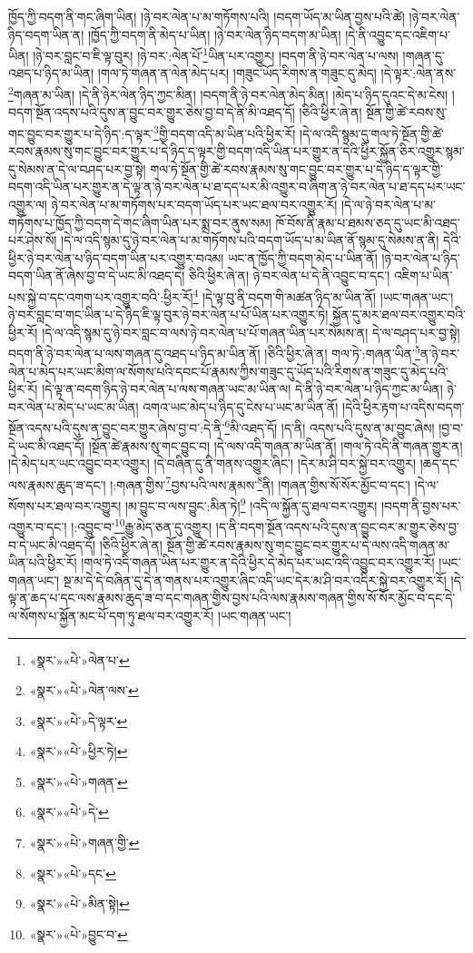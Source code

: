 ཁྱོད་ཀྱི་བདག་ནི་གང་ཞིག་ཡིན། །ཉེ་བར་ལེན་པ་མ་གཏོགས་པའི། །བདག་ཡོད་མ་ཡིན་བྱས་པའི་ཚེ། །ཉེ་བར་ལེན་ཉིད་བདག་ཡིན་ན། །ཁྱོད་ཀྱི་བདག་ནི་མེད་པ་ཡིན། །ཉེ་བར་ལེན་ཉིད་བདག་མ་ཡིན། །དེ་ནི་འབྱུང་དང་འཇིག་པ་ཡིན། །ཉེ་བར་བླང་བ་ཇི་ལྟ་བུར། །ཉེ་བར་:ལེན་པོ་\footnote{«སྣར་»«པེ་»ལེན་པ་}ཡིན་པར་འགྱུར། །བདག་ནི་ཉེ་བར་ལེན་པ་ལས། །གཞན་དུ་འཐད་པ་ཉིད་མ་ཡིན། །གལ་ཏེ་གཞན་ན་ལེན་མེད་པར། །གཟུང་ཡོད་རིགས་ན་གཟུང་དུ་མེད། །དེ་ལྟར་:ལེན་ནས་\footnote{«སྣར་»«པེ་»ལེན་ལས་}གཞན་མ་ཡིན། །དེ་ནི་ཉེར་ལེན་ཉིད་ཀྱང་མིན། །བདག་ནི་ཉེ་བར་ལེན་མེད་མིན། །མེད་པ་ཉིད་དུའང་དེ་མ་ངེས། །བདག་སྔོན་འདས་པའི་དུས་ན་བྱུང་བར་གྱུར་ཅེས་བྱ་བ་དེ་ནི་མི་འཐད་དོ། །ཅིའི་ཕྱིར་ཞེ་ན། སྔོན་གྱི་ཚེ་རབས་སུ་གང་བྱུང་བར་གྱུར་པ་དེ་ཉིད་:ད་ལྟར་\footnote{«སྣར་»«པེ་»དེ་ལྟར་}གྱི་བདག་འདི་མ་ཡིན་པའི་ཕྱིར་རོ། །དེ་ལ་འདི་སྙམ་དུ་གལ་ཏེ་སྔོན་གྱི་ཚེ་རབས་རྣམས་སུ་གང་བྱུང་བར་གྱུར་པ་དེ་ཉིད་ད་ལྟར་གྱི་བདག་འདི་ཡིན་པར་གྱུར་ན་དེའི་ཕྱིར་སྐྱོན་ཅིར་འགྱུར་སྙམ་དུ་སེམས་ན་དེ་ལ་བཤད་པར་བྱ་སྟེ། གལ་ཏེ་སྔོན་གྱི་ཚེ་རབས་རྣམས་སུ་གང་བྱུང་བར་གྱུར་པ་དེ་ཉིད་ད་ལྟར་གྱི་བདག་འདི་ཡིན་པར་གྱུར་ན་དེ་ལྟ་ན་ཉེ་བར་ལེན་པ་ཐ་དད་པར་མི་འགྱུར་བ་ཞིག་ན་ཉེ་བར་ལེན་པ་ཐ་དད་པར་ཡང་འགྱུར་ལ། ཉེ་བར་ལེན་པ་མ་གཏོགས་པར་བདག་ཡོད་པར་ཡང་ཐལ་བར་འགྱུར་རོ། །དེ་ལ་ཉེ་བར་ལེན་པ་མ་གཏོགས་པ་ཁྱོད་ཀྱི་བདག་དེ་གང་ཞིག་ཡིན་པར་སྨྲ་བར་ནུས་སམ། ཁོ་བོས་ནི་རྣམ་པ་ཐམས་ཅད་དུ་ཡང་མི་འཐད་པར་ཤེས་སོ། །དེ་ལ་འདི་སྙམ་དུ་ཉེ་བར་ལེན་པ་མ་གཏོགས་པའི་བདག་ཡོད་པ་མ་ཡིན་ནོ་སྙམ་དུ་སེམས་ན་ནི། དེའི་ཕྱིར་ཉེ་བར་ལེན་པ་ཉིད་བདག་ཡིན་པར་འགྱུར་བའམ། ཡང་ན་ཁྱོད་ཀྱི་བདག་མེད་པ་ཡིན་ནོ། །ཉེ་བར་ལེན་པ་ཉིད་བདག་ཡིན་ནོ་ཞེས་བྱ་བ་དེ་ཡང་མི་འཐད་དེ། ཅིའི་ཕྱིར་ཞེ་ན། ཉེ་བར་ལེན་པ་དེ་ནི་འབྱུང་བ་དང་། འཇིག་པ་ཡིན་པས་སྐྱེ་བ་དང་འགག་པར་འགྱུར་བའི་:ཕྱིར་རོ།\footnote{«སྣར་»«པེ་»ཕྱིར་ཏེ།} །དེ་ལྟ་བུ་ནི་བདག་གི་མཚན་ཉིད་མ་ཡིན་ནོ། །ཡང་གཞན་ཡང་། ཉེ་བར་བླང་བ་གང་ཡིན་པ་དེ་ཉིད་ཇི་ལྟ་བུར་ཉེ་བར་ལེན་པ་པོ་ཡིན་པར་འགྱུར་ཏེ། སྐྱོན་དུ་མར་ཐལ་བར་འགྱུར་བའི་ཕྱིར་རོ། །དེ་ལ་འདི་སྙམ་དུ་ཉེ་བར་བླང་བ་ལས་ཉེ་བར་ལེན་པ་པོ་གཞན་ཡིན་པར་སེམས་ན། དེ་ལ་བཤད་པར་བྱ་སྟེ། བདག་ནི་ཉེ་བར་ལེན་པ་ལས་གཞན་དུ་འཐད་པ་ཉིད་མ་ཡིན་ནོ། །ཅིའི་ཕྱིར་ཞེ་ན། གལ་ཏེ་:གཞན་ཡིན་\footnote{«སྣར་»«པེ་»གཞན་}ན་ཉེ་བར་ལེན་པ་མེད་པར་ཡང་མིག་ལ་སོགས་པའི་དབང་པོ་རྣམས་ཀྱིས་གཟུང་དུ་ཡོད་པའི་རིགས་ན་གཟུང་དུ་མེད་པའི་ཕྱིར་རོ། །དེ་ལྟ་ན་བདག་ཉིད་ཉེ་བར་ལེན་པ་ལས་གཞན་ཡང་མ་ཡིན་ལ། དེ་ནི་ཉེ་བར་ལེན་པ་ཉིད་ཀྱང་མ་ཡིན། ཉེ་བར་ལེན་པ་མེད་པ་ཡང་མ་ཡིན། འགའ་ཡང་མེད་པ་ཉིད་དུ་ངེས་པ་ཡང་མ་ཡིན་ནོ། །དེའི་ཕྱིར་རྟག་པ་འདིས་བདག་སྔོན་འདས་པའི་དུས་ན་བྱུང་བར་གྱུར་ཞེས་བྱ་བ་:དེ་ནི་\footnote{«སྣར་»«པེ་»དེ་}མི་འཐད་དོ། །ད་ནི། འདས་པའི་དུས་ན་མ་བྱུང་ཞེས། །བྱ་བ་དེ་ཡང་མི་འཐད་དོ། །སྔོན་ཚེ་རྣམས་སུ་གང་བྱུང་བ། །དེ་ལས་འདི་གཞན་མ་ཡིན་ནོ། །གལ་ཏེ་འདི་ནི་གཞན་གྱུར་ན། །དེ་མེད་པར་ཡང་འབྱུང་བར་འགྱུར། །དེ་བཞིན་དུ་ནི་གནས་འགྱུར་ཞིང་། །དེར་མ་ཤི་བར་སྐྱེ་བར་འགྱུར། །ཆད་དང་ལས་རྣམས་ཆུད་ཟ་དང་། །:གཞན་གྱིས་\footnote{«སྣར་»«པེ་»གཞན་གྱི་}བྱས་པའི་ལས་རྣམས་\footnote{«སྣར་»«པེ་»དང་}ནི། །གཞན་གྱིས་སོ་སོར་མྱོང་བ་དང་། །དེ་ལ་སོགས་པར་ཐལ་བར་འགྱུར། །མ་བྱུང་བ་ལས་བྱུང་:མིན་ཏེ།\footnote{«སྣར་»«པེ་»མིན་སྟེ།} །འདི་ལ་སྐྱོན་དུ་ཐལ་བར་འགྱུར། །བདག་ནི་བྱས་པར་འགྱུར་བ་དང་། །:འབྱུང་བ་\footnote{«སྣར་»«པེ་»བྱུང་བ་}རྒྱུ་མེད་ཅན་དུ་འགྱུར། །ད་ནི་བདག་སྔོན་འདས་པའི་དུས་ན་བྱུང་བར་མ་གྱུར་ཅེས་བྱ་བ་དེ་ཡང་མི་འཐད་དོ། །ཅིའི་ཕྱིར་ཞེ་ན། སྔོན་གྱི་ཚེ་རབས་རྣམས་སུ་གང་བྱུང་བར་གྱུར་པ་དེ་ལས་འདི་གཞན་མ་ཡིན་པའི་ཕྱིར་རོ། །གལ་ཏེ་འདི་གཞན་ཡིན་པར་གྱུར་ན་དེའི་ཕྱིར་དེ་མེད་པར་ཡང་འདི་འབྱུང་བར་འགྱུར་རོ། །ཡང་གཞན་ཡང་། སྔ་མ་དེ་དེ་བཞིན་དུ་དེ་ན་གནས་པར་འགྱུར་ཞིང་འདི་ཡང་དེར་མ་ཤི་བར་འདིར་སྐྱེ་བར་འགྱུར་རོ། །དེ་ལྟ་ན་ཆད་པ་དང་ལས་རྣམས་ཆུད་ཟ་བ་དང་གཞན་གྱིས་བྱས་པའི་ལས་རྣམས་གཞན་གྱིས་སོ་སོར་མྱོང་བ་དང་དེ་ལ་སོགས་པ་སྐྱོན་མང་པོ་དག་ཏུ་ཐལ་བར་འགྱུར་རོ། །ཡང་གཞན་ཡང་། 